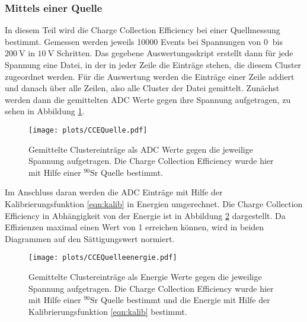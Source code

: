 \subsubsection{Mittels einer Quelle}
\label{sec:CCEQ}

In diesem Teil wird die Charge Collection Efficiency bei einer 
Quellmessung bestimmt. Gemessen werden jeweils 10000 Events 
bei Spannungen von $\SI{0}{}$ bis $\SI{200}{\volt}$ in 
$\SI{10}{\volt}$ Schritten. Das gegebene Auswertungsskript erstellt 
dann für jede Spannung eine Datei, in der in jeder Zeile die 
Einträge stehen, die diesem Cluster zugeordnet werden. Für die Auswertung 
werden die Einträge einer Zeile addiert und danach über alle Zeilen, also 
alle Cluster der Datei gemittelt. Zunächst werden dann die gemittelten ADC 
Werte gegen ihre Spannung aufgetragen, zu sehen in Abbildung \ref{fig:ADCCluster}.

\begin{figure}[H]
  \centering
  \texttt{[image: plots/CCEQuelle.pdf]}
  \caption{Gemittelte Clustereinträge als ADC Werte gegen die jeweilige 
  Spannung aufgetragen. Die Charge Collection Efficiency wurde hier mit 
  Hilfe einer $^{90}\text{Sr}$ Quelle bestimmt.}
  \label{fig:ADCCluster}
\end{figure}

Im Anschluss daran werden die ADC Einträge mit Hilfe der 
Kalibrierungsfunktion \eqref{eqn:kalib} in Energien umgerechnet. Die Charge 
Collection Efficiency in Abhängigkeit von der Energie ist in 
Abbildung \ref{fig:Energiecluster} dargestellt. Da Effizienzen maximal einen 
Wert von 1 erreichen können, wird in beiden Diagrammen auf den Sättigungswert 
normiert.

\begin{figure}[H]
  \centering
  \texttt{[image: plots/CCEQuelleenergie.pdf]}
  \caption{Gemittelte Clustereinträge als Energie Werte gegen die jeweilige 
  Spannung aufgetragen. Die Charge Collection Efficiency wurde hier mit 
  Hilfe einer $^{90}\text{Sr}$ Quelle bestimmt und die Energie mit 
  Hilfe der Kalibrierungsfunktion \eqref{eqn:kalib} bestimmt.}
  \label{fig:Energiecluster}
\end{figure}